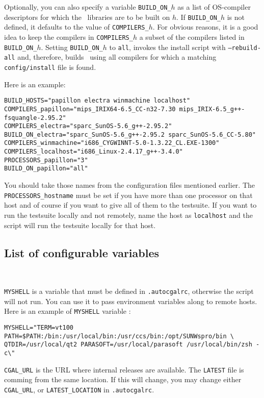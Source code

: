 Optionally, you can also specify a variable \texttt{BUILD\_ON\_$h$} as
a list of OS-compiler descriptors for which the \cgal\ libraries are
to be built on $h$. If \texttt{BUILD\_ON\_$h$} is not defined, it
defaults to the value of \texttt{COMPILERS\_$h$}. For obvious reasons,
it is a good idea to keep the compilers in \texttt{COMPILERS\_$h$} a
subset of the compilers listed in \texttt{BUILD\_ON\_$h$}. Setting
\texttt{BUILD\_ON\_$h$} to \texttt{all}, invokes the install script
with \texttt{--rebuild-all} and, therefore, builds \cgal\ using all
compilers for which a matching \texttt{config/install} file is found.

\noindent Here is an example:
\begingroup\small
\begin{verbatim}
BUILD_HOSTS="papillon electra winmachine localhost"
COMPILERS_papillon="mips_IRIX64-6.5_CC-n32-7.30 mips_IRIX-6.5_g++-fsquangle-2.95.2"
COMPILERS_electra="sparc_SunOS-5.6_g++-2.95.2"
BUILD_ON_electra="sparc_SunOS-5.6_g++-2.95.2 sparc_SunOS-5.6_CC-5.80"
COMPILERS_winmachine="i686_CYGWINNT-5.0-1.3.22_CL.EXE-1300"
COMPILERS_localhost="i686_Linux-2.4.17_g++-3.4.0"
PROCESSORS_papillon="3" 
BUILD_ON_papillon="all"
\end{verbatim}\endgroup
You should take those names from the configuration files mentioned
earlier. The {\tt PROCESSORS\_hostname} must be set if you have more
than one processor on that host and of course if you want to give all
of them to the testsuite. If you want to run the testsuite locally and
not remotely, name the host as {\tt localhost} and the script will run
the testsuite locally for that host.

\subsection{List of configurable variables} ~

{\tt MYSHELL} is a variable that must be defined in {\tt .autocgalrc},
otherwise the script will not run.  You can use it to pass environment
variables along to remote hosts.  Here is an example of {\tt MYSHELL}
variable :
\begin{verbatim}
MYSHELL="TERM=vt100 PATH=$PATH:/bin:/usr/local/bin:/usr/ccs/bin:/opt/SUNWspro/bin \
QTDIR=/usr/local/qt2 PARASOFT=/usr/local/parasoft /usr/local/bin/zsh -c\"
\end{verbatim}

{\tt CGAL\_URL} is the URL where internal releases are available.
The {\tt LATEST} file is comming from the same location. If this will change,
you may change either {\tt CGAL\_URL}, or {\tt LATEST\_LOCATION}
in {\tt .autocgalrc}.

